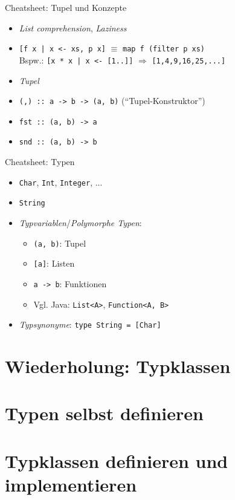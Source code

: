 \documentclass{beamer}
\begin{document}
\begin{frame}{Cheatsheet: Tupel und Konzepte}
  \begin{itemize}
    \item \emph{List comprehension}, \emph{Laziness}
    \item \texttt{[f x | x <- xs, p x]} $\equiv$ \texttt{map f (filter p xs)}\\
      Bspw.: \texttt{[x * x | x <- [1..]]} $\Rightarrow$ \texttt{[1,4,9,16,25,...]}
    \item \emph{Tupel}
    \item \texttt{(,) :: a -> b -> (a, b)} (\enquote{Tupel-Konstruktor})
    \item \texttt{fst :: (a, b) -> a}
    \item \texttt{snd :: (a, b) -> b}
  \end{itemize}
\end{frame}

\begin{frame}{Cheatsheet: Typen}
  \begin{itemize}
    \item \texttt{Char}, \texttt{Int}, \texttt{Integer}, ...
    \item \texttt{String}
    \item \emph{Typvariablen}/\emph{Polymorphe Typen}:
    \begin{itemize}
      \item \texttt{(a, b)}: Tupel
      \item \texttt{[a]}: Listen
      \item \texttt{a -> b}: Funktionen
      \item Vgl. Java: \texttt{List<A>}, \texttt{Function<A, B>}
    \end{itemize}
    \item \emph{Typsynonyme}: \texttt{type String = [Char]}
  \end{itemize}
\end{frame}

\section{Wiederholung: Typklassen}

\section{Typen selbst definieren}

\section{Typklassen definieren und implementieren}
\end{document}
